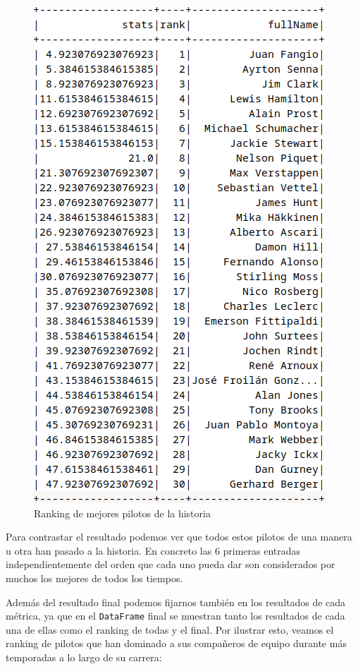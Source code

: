 \documentclass[12pt,twoside,titlepage]{report}
\begin{document}
\begin{figure}[H]
	\includegraphics[scale=0.3]{results/bestdrivers/bestdrivers.png}
	\centering
	\caption{Ranking de mejores pilotos de la historia}
	\label{fig:bestDrivers}
	\centering
\end{figure}

Para contrastar el resultado podemos ver que todos estos pilotos de una manera u otra han pasado a la historia. En concreto las 6 primeras entradas independientemente del orden que cada uno pueda dar son considerados por muchos los mejores de todos los tiempos.

Además del resultado final podemos fijarnos también en los resultados de cada métrica, ya que en el \texttt{DataFrame} final se muestran tanto los resultados de cada una de ellas como el ranking de todas y el final. Por ilustrar esto, veamos el ranking de pilotos que han dominado a sus compañeros de equipo durante más temporadas a lo largo de su carrera:
\end{document}
